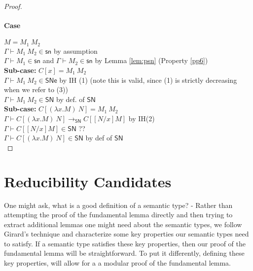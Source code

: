 \documentclass{article}
\newcommand{\SN}{\mathsf{SN}}
\newcommand{\SNe}{\mathsf{SNe}}
\newcommand{\csn}{\mathsf{sn}}
\newcommand{\redSN}{\longrightarrow_\SN}
\begin{document}
\begin{proof}
\paragraph{Case} $M = M_1~M_2$
\\[1em]
$\Gamma \vdash M_1~M_2 \in \csn$ \hfill by assumption\\
$\Gamma \vdash M_1 \in \csn$ and $\Gamma \vdash M_2 \in \csn$ \hfill by Lemma \ref{lem:psn} (Property \ref{pp6})
\\[0.5em]
 \textbf{Sub-case:} $C[x] = M_1~M_2$ \\[0.5em]
 $\Gamma \vdash M_1~M_2 \in \SNe$ \hfill by IH (1) (note this is valid,
 since (1) is strictly decreasing when we refer to (3))\\
 $\Gamma \vdash M_1~M_2 \in \SN$ \hfill by def. of $\SN$
 \\[1em]
 \textbf{Sub-case:} $C[(\lambda x.M)~N] = M_1~M_2$ \\[0.5em]
 $\Gamma \vdash C[(\lambda x.M)~N] \redSN C[[N/x]M]$ \hfill by IH(2)\\
$\Gamma \vdash C[[N/x]M] \in \SN$ \hfill ??\\
 $\Gamma \vdash C[(\lambda x.M)~N] \in \SN$ \hfill by def of $\SN$ \\

\end{proof}


\section{Reducibility Candidates}
One might ask, what is a good definition of a semantic type? - Rather than
attempting the proof of the fundamental lemma directly and then trying to
extract additional lemmas one might need about the semantic types, we follow
Girard's technique and characterize some key properties our semantic types need
to satisfy. If a semantic type satisfies these key properties, then our proof of the fundamental lemma will be straightforward. To put it differently, defining these key properties, will allow for a  a modular proof of the fundamental lemma.
\end{document}
